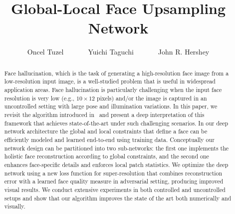\documentclass[runningheads]{llncs}
\begin{document}
\pagestyle{headings}
\mainmatter
\def\ECCV16SubNumber{1207}  %



\title{Global-Local Face Upsampling Network} %



\author{Oncel Tuzel\ \ \ \ \ \ \  Yuichi Taguchi\ \ \ \ \ \ \  John R. Hershey}


\def\etal{et al.}

\maketitle



\begin{abstract}
Face hallucination, which is the task of generating a high-resolution face image from a low-resolution input image, is a well-studied problem that is useful in widespread application areas. Face hallucination is particularly challenging when the input face resolution is very low (e.g., $10 \times 12$ pixels) and/or the image is captured in an uncontrolled setting with large pose and illumination variations. In this paper, we revisit the algorithm introduced in~\cite{Liu07} and present a deep interpretation of this framework that achieves state-of-the-art under such challenging scenarios. In our deep network architecture the global and local constraints that define a face can be efficiently modeled and learned end-to-end using training data. Conceptually our network design can be partitioned into two sub-networks: the first one implements the holistic face reconstruction according to global constraints, and the second one enhances face-specific details and enforces local patch statistics. We optimize the deep network using a new loss function for super-resolution that combines reconstruction error with a learned face quality measure in adversarial setting, producing improved visual results. We conduct extensive experiments in both controlled and uncontrolled setups and show that our algorithm improves the state of the art both numerically and visually.


\end{abstract}
\end{document}
